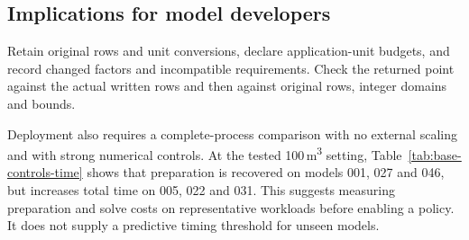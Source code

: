 \subsection{Implications for model developers}
\label{subsec:orf-practical}
Retain original rows and unit conversions, declare application-unit budgets, and
record changed factors and incompatible requirements. Check the returned point
against the actual written rows and then against original rows, integer domains
and bounds.

Deployment also requires a complete-process comparison with no external scaling and
with strong numerical controls. At the tested 100\,m\textsuperscript{3} setting,
Table~\ref{tab:base-controls-time} shows that preparation is recovered on models
001, 027 and 046, but increases total time on 005, 022 and 031. This suggests measuring
preparation and solve costs on representative workloads before enabling a policy.
It does not supply a predictive timing threshold for unseen models.
